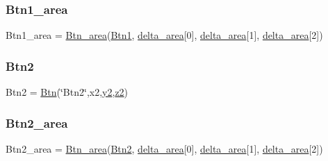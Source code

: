 \subsubsection{\texorpdfstring{Btn1\+\_\+area}{Btn1\_area}}
{\footnotesize\ttfamily Btn1\+\_\+area = \hyperlink{classRET__config_1_1Btn__area}{Btn\+\_\+area}(\hyperlink{namespaceRET__config_af037c6b9ff0314103d8127acc9d07e0b}{Btn1}, \hyperlink{namespaceRET__config_abbf3fd8fafae6a457e57109bfaf9a6c5}{delta\+\_\+area}\mbox{[}0\mbox{]}, \hyperlink{namespaceRET__config_abbf3fd8fafae6a457e57109bfaf9a6c5}{delta\+\_\+area}\mbox{[}1\mbox{]}, \hyperlink{namespaceRET__config_abbf3fd8fafae6a457e57109bfaf9a6c5}{delta\+\_\+area}\mbox{[}2\mbox{]})}

\mbox{\label{namespaceRET__config_a73afa8c52cebd94e1889df5fbe3bec66}} 
\subsubsection{\texorpdfstring{Btn2}{Btn2}}
{\footnotesize\ttfamily Btn2 = \hyperlink{classRET__config_1_1Btn}{Btn}(\char`\"{}Btn2\char`\"{},x2,\hyperlink{namespaceRET__config_a07bcd014e69eddcf4243b2a961014eaf}{y2},\hyperlink{namespaceRET__config_a55196b87940893e540ba636218f4eb07}{z2})}

\mbox{\label{namespaceRET__config_a51a4083768cbc17b22a98ad63a7bf851}} 
\subsubsection{\texorpdfstring{Btn2\+\_\+area}{Btn2\_area}}
{\footnotesize\ttfamily Btn2\+\_\+area = \hyperlink{classRET__config_1_1Btn__area}{Btn\+\_\+area}(\hyperlink{namespaceRET__config_a73afa8c52cebd94e1889df5fbe3bec66}{Btn2}, \hyperlink{namespaceRET__config_abbf3fd8fafae6a457e57109bfaf9a6c5}{delta\+\_\+area}\mbox{[}0\mbox{]}, \hyperlink{namespaceRET__config_abbf3fd8fafae6a457e57109bfaf9a6c5}{delta\+\_\+area}\mbox{[}1\mbox{]}, \hyperlink{namespaceRET__config_abbf3fd8fafae6a457e57109bfaf9a6c5}{delta\+\_\+area}\mbox{[}2\mbox{]})}

\mbox{\label{namespaceRET__config_abbf3fd8fafae6a457e57109bfaf9a6c5}} 
